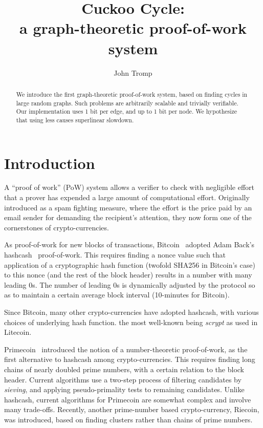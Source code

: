 \documentclass[11pt, oneside]{article}
\title{Cuckoo Cycle: \protect\\ a graph-theoretic proof-of-work system}
\author{John Tromp}
\begin{document}
\maketitle

\begin{abstract}
We introduce the first graph-theoretic proof-of-work system,
based on finding cycles in large random graphs.
Such problems are arbitrarily scalable and trivially verifiable.
Our implementation uses 1 bit per edge, and up to 1 bit per node.
We hypothesize that using less causes superlinear slowdown.
\end{abstract}

\section{Introduction}
A ``proof of work'' (PoW) system allows a verifier to check with negligible
effort that a prover has expended a large amount of computational effort.
Originally introduced as a spam fighting measure, 
where the effort is the price paid by an email sender for demanding the
recipient's attention, they now form one of the cornerstones of
crypto-currencies.

As proof-of-work for new blocks of transactions,
Bitcoin~\cite{nakamoto2009bitcoin} adopted Adam Back's hashcash~\cite{back2002} proof-of-work.
This requires finding a nonce value such that
application of a cryptographic hash function (twofold SHA256 in Bitcoin's case)
to this nonce (and the rest of the block header) results in a number with
many leading 0s. The number of leading 0s is dynamically adjusted by the protocol
so as to maintain a certain average block interval (10-minutes for Bitcoin).

Since Bitcoin, many other crypto-currencies have adopted hashcash, with various
choices of underlying hash function. the most well-known being {\em scrypt} as
used in Litecoin.

Primecoin~\cite{king2013} introduced the notion of a number-theoretic proof-of-work,
as the first alternative to hashcash among crypto-currencies.
This requires finding long chains of nearly doubled prime numbers, with a certain
relation to the block header.
Current algorithms use a two-step process of filtering
candidates by {\em sieving}, and applying pseudo-primality tests to remaining
candidates. Unlike hashcash, current algorithms for Primecoin are somewhat complex and
involve many trade-offs.
Recently, another prime-number based crypto-currency, Riecoin, was introduced, based
on finding clusters rather than chains of prime numbers.
\end{document}
